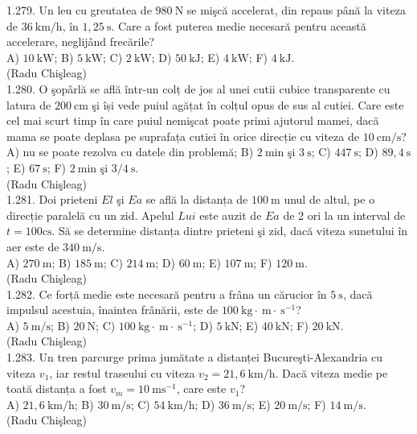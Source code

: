1.279. Un leu cu greutatea de $980 \mathrm{~N}$ se mişcă accelerat, din repaus până la viteza de $36 \mathrm{~km} / \mathrm{h}$, în $1,25 \mathrm{~s}$. Care a fost puterea medie necesară pentru această accelerare, neglijând frecările?\\ A) $10 \mathrm{~kW}$; B) $5 \mathrm{~kW}$; C) $2 \mathrm{~kW}$; D) $50 \mathrm{~kJ}$; E) $4 \mathrm{~kW}$; F) $4 \mathrm{~kJ}$.\\ (Radu Chişleag)\\

1.280. O şopârlă se află într-un colț de jos al unei cutii cubice transparente cu latura de $200 \mathrm{~cm}$ şi își vede puiul agățat în colțul opus de sus al cutiei. Care este cel mai scurt timp în care puiul nemişcat poate primi ajutorul mamei, dacă mama se poate deplasa pe suprafața cutiei în orice direcție cu viteza de $10 \mathrm{~cm} / \mathrm{s}$?\\ A) nu se poate rezolva cu datele din problemă; B) $2 \mathrm{~min}$ şi $3 \mathrm{~s}$; C) $447 \mathrm{~s}$; D) $89,4 \mathrm{~s}$; E) $67 \mathrm{~s}$; F) $2 \mathrm{~min}$ şi $3 / 4 \mathrm{~s}$.\\ (Radu Chişleag)\\

1.281. Doi prieteni $El$ şi $Ea$ se află la distanța de $100 \mathrm{~m}$ unul de altul, pe o direcție paralelă cu un zid. Apelul $Lui$ este auzit de $Ea$ de 2 ori la un interval de $t=100 \mathrm{cs}$. Să se determine distanța dintre prieteni şi zid, dacă viteza sunetului în aer este de $340 \mathrm{~m} / \mathrm{s}$.\\ A) $270 \mathrm{~m}$; B) $185 \mathrm{~m}$; C) $214 \mathrm{~m}$; D) $60 \mathrm{~m}$; E) $107 \mathrm{~m}$; F) $120 \mathrm{~m}$.\\ (Radu Chişleag)\\

1.282. Ce forță medie este necesară pentru a frâna un cărucior în $5 \mathrm{~s}$, dacă impulsul acestuia, înaintea frânării, este de $100 \mathrm{~kg} \cdot \mathrm{~m} \cdot \mathrm{~s}^{-1}$?\\ A) $5 \mathrm{~m} / \mathrm{s}$; B) $20 \mathrm{~N}$; C) $100 \mathrm{~kg} \cdot \mathrm{~m} \cdot \mathrm{~s}^{-1}$; D) $5 \mathrm{~kN}$; E) $40 \mathrm{~kN}$; F) $20 \mathrm{~kN}$.\\ (Radu Chişleag)\\

1.283. Un tren parcurge prima jumătate a distanței Bucureşti-Alexandria cu viteza $v_{1}$, iar restul traseului cu viteza $v_{2}=21,6 \mathrm{~km} / \mathrm{h}$. Dacă viteza medie pe toată distanța a fost $v_{m}=10 \mathrm{~ms}^{-1}$, care este $v_{1}$?\\ A) $21,6 \mathrm{~km} / \mathrm{h}$; B) $30 \mathrm{~m} / \mathrm{s}$; C) $54 \mathrm{~km} / \mathrm{h}$; D) $36 \mathrm{~m} / \mathrm{s}$; E) $20 \mathrm{~m} / \mathrm{s}$; F) $14 \mathrm{~m} / \mathrm{s}$.\\ (Radu Chişleag)\\

